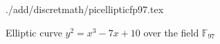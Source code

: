 \begin{figure}
\centering
 {./add/discretmath/picellipticfp97.tex}
\caption{Elliptic curve $y^2 = x^3 -7 x + 10$ over the field
  $\mathbb{F}_{97}$}
\label{fig:add:ellipticFp97}
\end{figure}
